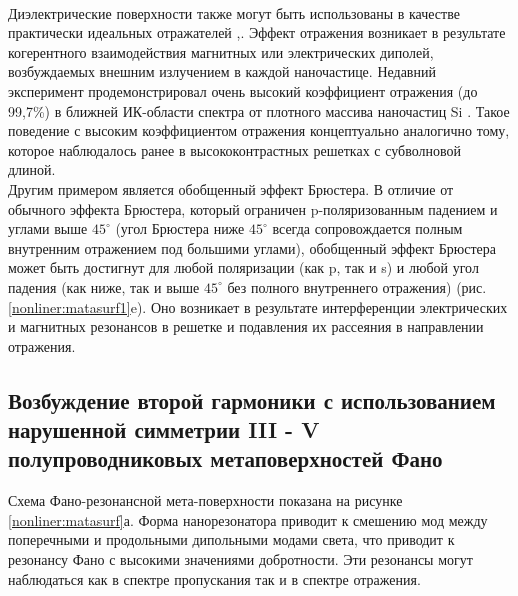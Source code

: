 \\
\hspace*{2mm}
Диэлектрические поверхности также могут быть использованы в качестве практически идеальных отражателей \cite{moitra2015large},\cite{nearRefcLayer}.  Эффект отражения возникает в результате когерентного взаимодействия магнитных или электрических диполей, возбуждаемых внешним излучением в каждой наночастице. Недавний эксперимент продемонстрировал очень высокий коэффициент отражения (до 99,7\%) в ближней ИК-области спектра от плотного массива наночастиц Si \cite{moitra2015large}. Такое поведение с высоким коэффициентом отражения концептуально аналогично тому, которое наблюдалось ранее в высококонтрастных решетках с субволновой длиной. 
\\
\hspace*{2mm}
Другим примером является обобщенный эффект Брюстера. В отличие от обычного эффекта Брюстера, который ограничен p-поляризованным падением и углами выше $45^\circ$ (угол Брюстера ниже $45^\circ$ всегда сопровождается полным внутренним отражением под большими углами), обобщенный эффект Брюстера может быть достигнут для любой поляризации (как p, так и s) и любой угол падения (как ниже, так и выше $45^\circ$ без полного внутреннего отражения) (рис. \ref{nonliner:matasurf1}e). Оно возникает в результате интерференции электрических и магнитных резонансов в решетке и подавления их рассеяния в направлении отражения.

\subsection*{Возбуждение второй гармоники с использованием нарушенной симметрии III - V полупроводниковых метаповерхностей Фано}

\hspace*{2mm}
Схема Фано-резонансной мета-поверхности показана на рисунке  \ref{nonliner:matasurf}а. Форма нанорезонатора приводит к смешению мод между поперечными и продольными дипольными модами света, что приводит к резонансу Фано с высокими значениями добротности. Эти резонансы могут наблюдаться как в спектре  пропускания так и в спектре отражения.


